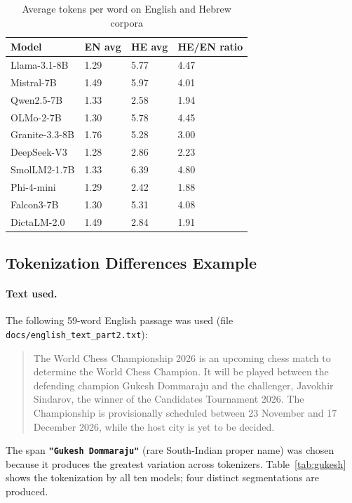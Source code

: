 \documentclass[11pt, a4paper]{article}
\begin{document}
\begin{table}[H]
\centering
\caption{Average tokens per word on English and Hebrew corpora}
\label{tab:avgtokens}
\small
\begin{tabular}{L{3.4cm} R{2.2cm} R{2.2cm} R{2.0cm}}
\toprule
\textbf{Model} & \textbf{EN avg} & \textbf{HE avg} & \textbf{HE/EN ratio} \\
\midrule
Llama-3.1-8B    & 1.29 & 5.77 & 4.47 \\
Mistral-7B      & 1.49 & 5.97 & 4.01 \\
Qwen2.5-7B      & 1.33 & 2.58 & 1.94 \\
OLMo-2-7B       & 1.30 & 5.78 & 4.45 \\
Granite-3.3-8B  & 1.76 & 5.28 & 3.00 \\
DeepSeek-V3     & 1.28 & 2.86 & 2.23 \\
SmolLM2-1.7B    & 1.33 & 6.39 & 4.80 \\
Phi-4-mini      & 1.29 & 2.42 & 1.88 \\
Falcon3-7B      & 1.30 & 5.31 & 4.08 \\
DictaLM-2.0     & 1.49 & 2.84 & 1.91 \\
\bottomrule
\end{tabular}
\end{table}

\subsection{Tokenization Differences Example}

\paragraph{Text used.}
The following 59-word English passage was used
(file \texttt{docs/english\_text\_part2.txt}):

\begin{quote}
\small
The World Chess Championship 2026 is an upcoming chess match to determine the
World Chess Champion.  It will be played between the defending champion Gukesh
Dommaraju and the challenger, Javokhir Sindarov, the winner of the Candidates
Tournament 2026.  The Championship is provisionally scheduled between 23
November and 17 December 2026, while the host city is yet to be decided.
\end{quote}

The span \textbf{\texttt{"Gukesh Dommaraju"}} (rare South-Indian proper name)
was chosen because it produces the greatest variation across tokenizers.
Table~\ref{tab:gukesh} shows the tokenization by all ten models; four distinct
segmentations are produced.
\end{document}
